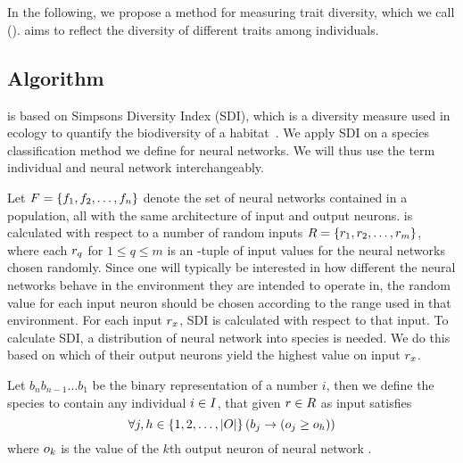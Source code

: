 \section{\di{}}\label{sec:nntd}
In the following, we propose a method for measuring trait diversity, which we call \emph{\di{}} (\dia). \dia{} aims to reflect the diversity of different traits among individuals. 

\subsection{Algorithm}
\dia{} is based on Simpsons Diversity Index (SDI), which is a diversity measure used in ecology to quantify the biodiversity of a habitat~\cite{simpson1949measurement}. We apply SDI on a species classification method we define for neural networks. We will thus use the term individual and neural network interchangeably.

Let $F = \left\{ f_1, f_2, \dots, f_n \right\}$ denote the set of neural networks contained in a population, all with the same architecture of \nninsetl{} input and \nnoutsetl{} output neurons. \dia{} is calculated with respect to a number of random inputs $R = \left\{ r_1, r_2, \dots, r_m \right\}$, where each $r_q$ for $1 \leq q \leq m$ is an \nninsetl-tuple of input values for the neural networks chosen randomly. Since one will typically be interested in how different the neural networks behave in the environment they are intended to operate in, the random value for each input neuron should be chosen according to the range used in that environment.  For each input $r_x$, SDI is calculated with respect to that input.  To calculate SDI, a distribution of neural network into species is needed. We do this based on which of their output neurons yield the highest value on input $r_x$. 

Let $b_{n}b_{n-1}\dots b_1$ be the binary representation of a number $i$,
then we define the species  to contain any individual $i \in I$, that given $r \in R$ as input satisfies
%
\[
  \forall j, h \in \left\{ 1, 2, \dots, \lvert O\rvert \right\} \left(b_j \rightarrow \left(o_j \geq o_h\right)\right)
\]
%
where $o_k$ is the value of the $k$th output neuron of neural network \ind.

